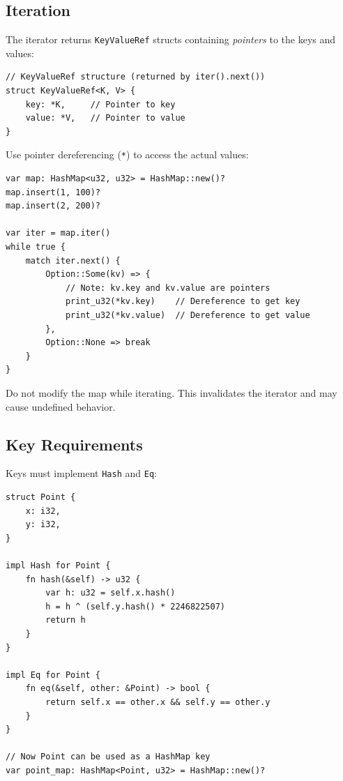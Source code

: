 \subsection{Iteration}

The iterator returns \texttt{KeyValueRef} structs containing \emph{pointers} to the keys and values:

\begin{lstlisting}
// KeyValueRef structure (returned by iter().next())
struct KeyValueRef<K, V> {
    key: *K,     // Pointer to key
    value: *V,   // Pointer to value
}
\end{lstlisting}

Use pointer dereferencing (\texttt{*}) to access the actual values:

\begin{lstlisting}
var map: HashMap<u32, u32> = HashMap::new()?
map.insert(1, 100)?
map.insert(2, 200)?

var iter = map.iter()
while true {
    match iter.next() {
        Option::Some(kv) => {
            // Note: kv.key and kv.value are pointers
            print_u32(*kv.key)    // Dereference to get key
            print_u32(*kv.value)  // Dereference to get value
        },
        Option::None => break
    }
}
\end{lstlisting}

\begin{warningbox}
Do not modify the map while iterating. This invalidates the iterator and may cause undefined behavior.
\end{warningbox}

\subsection{Key Requirements}

Keys must implement \texttt{Hash} and \texttt{Eq}:

\begin{lstlisting}
struct Point {
    x: i32,
    y: i32,
}

impl Hash for Point {
    fn hash(&self) -> u32 {
        var h: u32 = self.x.hash()
        h = h ^ (self.y.hash() * 2246822507)
        return h
    }
}

impl Eq for Point {
    fn eq(&self, other: &Point) -> bool {
        return self.x == other.x && self.y == other.y
    }
}

// Now Point can be used as a HashMap key
var point_map: HashMap<Point, u32> = HashMap::new()?
\end{lstlisting}

